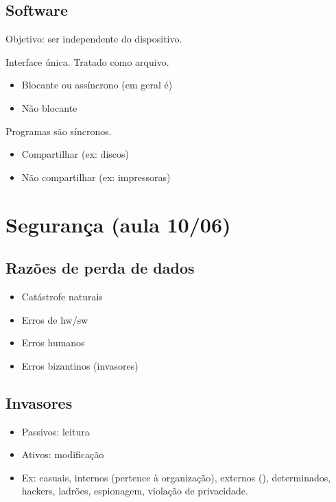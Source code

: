 \documentclass[11pt]{article}
\begin{document}
\subsection{Software}
\label{sec:org7eb6451}
Objetivo: ser independente do dispositivo.

Interface única. Tratado como arquivo.


\begin{itemize}
\item Blocante ou assíncrono (em geral é)
\item Não blocante
\end{itemize}


Programas são síncronos.

\begin{itemize}
\item Compartilhar (ex: discos)
\item Não compartilhar (ex: impressoras)
\end{itemize}
\section{Segurança (aula 10/06)}
\label{sec:org3928316}
\subsection{Razões de perda de dados}
\label{sec:org3d4b63d}
\begin{itemize}
\item Catástrofe naturais
\item Erros de hw/sw
\item Erros humanos
\item Erros bizantinos (invasores)
\end{itemize}

\subsection{Invasores}
\label{sec:orgfe4e4dc}
\begin{itemize}
\item Passivos: leitura
\item Ativos: modificação
\item Ex: casuais, internos (pertence à organização), externos (), determinados, hackers, ladrões, espionagem, violação
de privacidade.
\end{itemize}
\end{document}
